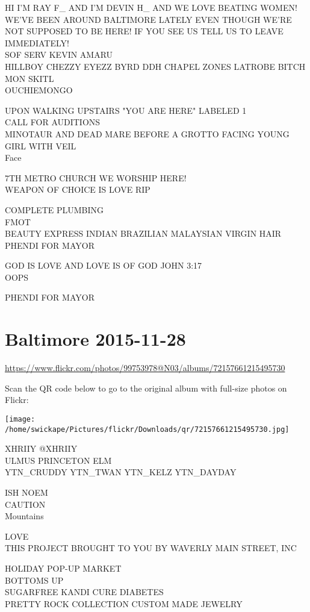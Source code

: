 \documentclass[10pt,letterpaper]{article}
\begin{document}
HI I'M RAY F\_ AND I'M DEVIN H\_ AND WE LOVE BEATING WOMEN!  WE'VE BEEN AROUND BALTIMORE LATELY EVEN THOUGH WE'RE NOT SUPPOSED TO BE HERE!  IF YOU SEE US TELL US TO LEAVE IMMEDIATELY!\\
SOF SERV KEVIN AMARU\\
HILLBOY CHEZZY EYEZZ BYRD DDH CHAPEL ZONES LATROBE BITCH MON SKITL\\
OUCHIEMONGO

UPON WALKING UPSTAIRS "YOU ARE HERE" LABELED 1\\
CALL FOR AUDITIONS\\
MINOTAUR AND DEAD MARE BEFORE A GROTTO FACING YOUNG GIRL WITH VEIL\\
Face

7TH METRO CHURCH WE WORSHIP HERE!\\
WEAPON OF CHOICE IS LOVE RIP

COMPLETE PLUMBING\\
FMOT\\
BEAUTY EXPRESS INDIAN BRAZILIAN MALAYSIAN VIRGIN HAIR\\
PHENDI FOR MAYOR

GOD IS LOVE AND LOVE IS OF GOD JOHN 3:17\\
OOPS

PHENDI FOR MAYOR
\pagebreak

\section*{Baltimore 2015-11-28}

\url{https://www.flickr.com/photos/99753978@N03/albums/72157661215495730}

Scan the QR code below to go to the original album with full-size photos on Flickr:

\texttt{[image: /home/swickape/Pictures/flickr/Downloads/qr/72157661215495730.jpg]}
\pagebreak

XHRIIY @XHRIIY\\
ULMUS PRINCETON ELM\\
YTN\_CRUDDY YTN\_TWAN YTN\_KELZ YTN\_DAYDAY

ISH NOEM\\
CAUTION\\
Mountains

LOVE\\
THIS PROJECT BROUGHT TO YOU BY WAVERLY MAIN STREET, INC

HOLIDAY POP{-}UP MARKET\\
BOTTOMS UP\\
SUGARFREE KANDI CURE DIABETES\\
PRETTY ROCK COLLECTION CUSTOM MADE JEWELRY
\end{document}
